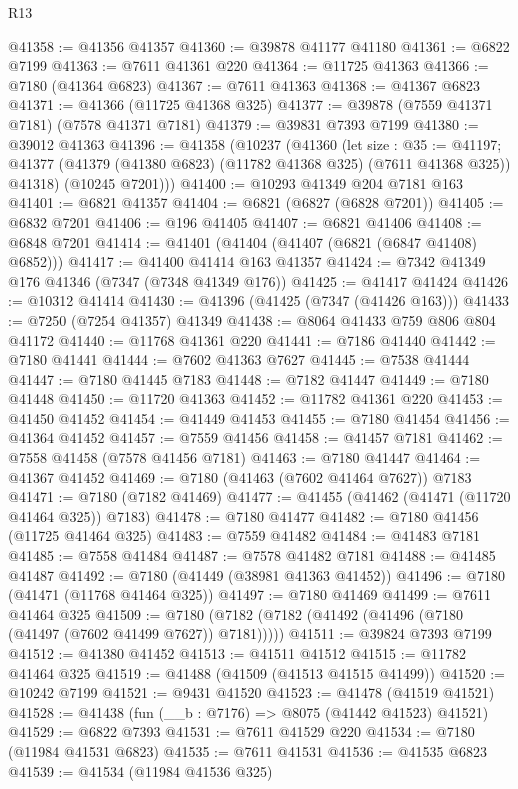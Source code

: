 \begin{lexlean}{R13}
\begin{coremodule}
@41358 := @41356 @41357
@41360 := @39878 @41177 @41180
@41361 := @6822 @7199
@41363 := @7611 @41361 @220
@41364 := @11725 @41363
@41366 := @7180 (@41364 @6823)
@41367 := @7611 @41363
@41368 := @41367 @6823
@41371 := @41366 (@11725 @41368 @325)
@41377 := @39878 (@7559 @41371 @7181) (@7578 @41371 @7181)
@41379 := @39831 @7393 @7199
@41380 := @39012 @41363
@41396 := @41358
    (@10237
      (@41360
        (let size : @35 := @41197;
        @41377 (@41379 (@41380 @6823) (@11782 @41368 @325) (@7611 @41368 @325)) @41318)
        (@10245 @7201)))
@41400 := @10293 @41349 @204 @7181 @163
@41401 := @6821 @41357
@41404 := @6821 (@6827 (@6828 @7201))
@41405 := @6832 @7201
@41406 := @196 @41405
@41407 := @6821 @41406
@41408 := @6848 @7201
@41414 := @41401 (@41404 (@41407 (@6821 (@6847 @41408) @6852)))
@41417 := @41400 @41414 @163 @41357
@41424 := @7342 @41349 @176 @41346 (@7347 (@7348 @41349 @176))
@41425 := @41417 @41424
@41426 := @10312 @41414
@41430 := @41396 (@41425 (@7347 (@41426 @163)))
@41433 := @7250 (@7254 @41357) @41349
@41438 := @8064 @41433 @759 @806 @804 @41172
@41440 := @11768 @41361 @220
@41441 := @7186 @41440
@41442 := @7180 @41441
@41444 := @7602 @41363 @7627
@41445 := @7538 @41444
@41447 := @7180 @41445 @7183
@41448 := @7182 @41447
@41449 := @7180 @41448
@41450 := @11720 @41363
@41452 := @11782 @41361 @220
@41453 := @41450 @41452
@41454 := @41449 @41453
@41455 := @7180 @41454
@41456 := @41364 @41452
@41457 := @7559 @41456
@41458 := @41457 @7181
@41462 := @7558 @41458 (@7578 @41456 @7181)
@41463 := @7180 @41447
@41464 := @41367 @41452
@41469 := @7180 (@41463 (@7602 @41464 @7627)) @7183
@41471 := @7180 (@7182 @41469)
@41477 := @41455 (@41462 (@41471 (@11720 @41464 @325)) @7183)
@41478 := @7180 @41477
@41482 := @7180 @41456 (@11725 @41464 @325)
@41483 := @7559 @41482
@41484 := @41483 @7181
@41485 := @7558 @41484
@41487 := @7578 @41482 @7181
@41488 := @41485 @41487
@41492 := @7180 (@41449 (@38981 @41363 @41452))
@41496 := @7180 (@41471 (@11768 @41464 @325))
@41497 := @7180 @41469
@41499 := @7611 @41464 @325
@41509 := @7180 (@7182 (@7182 (@41492 (@41496 (@7180 (@41497 (@7602 @41499 @7627)) @7181)))))
@41511 := @39824 @7393 @7199
@41512 := @41380 @41452
@41513 := @41511 @41512
@41515 := @11782 @41464 @325
@41519 := @41488 (@41509 (@41513 @41515 @41499))
@41520 := @10242 @7199
@41521 := @9431 @41520
@41523 := @41478 (@41519 @41521)
@41528 := @41438 (fun (__b : @7176) => @8075 (@41442 @41523) @41521)
@41529 := @6822 @7393
@41531 := @7611 @41529 @220
@41534 := @7180 (@11984 @41531 @6823)
@41535 := @7611 @41531
@41536 := @41535 @6823
@41539 := @41534 (@11984 @41536 @325)

\end{coremodule}
\end{lexlean}
